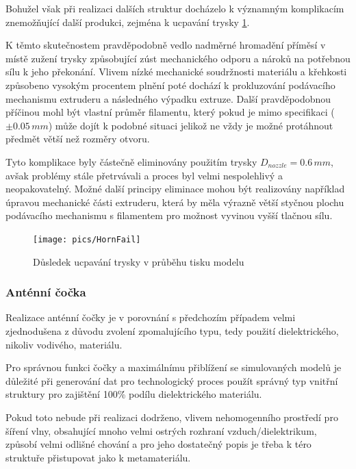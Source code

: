 Bohužel však při realizaci dalších struktur docházelo k významným komplikacím znemožňující další produkci, zejména k ucpavání trysky \ref{fig:HornFail}.

K těmto skutečnostem pravděpodobně vedlo nadměrné hromadění příměsí v místě zužení trysky způsobující zúst mechanického odporu a nároků na potřebnou sílu k jeho překonání. Vlivem nízké mechanické soudržnosti materiálu a křehkosti způsobeno vysokým procentem plnění poté dochází k prokluzování podávacího mechanismu extruderu a následného výpadku extruze. Další pravděpodobnou příčinou mohl být vlastní průměr filamentu, který pokud je mimo specifikaci ($\pm0.05\,mm$) může dojít k podobné situaci jelikož ne vždy je možné protáhnout předmět větší než rozměry otvoru. 

Tyto komplikace byly částečně eliminovány použitím trysky $D_{nozzle} = 0.6\,mm$, avšak problémy stále přetrvávali a proces byl velmi nespolehlivý a neopakovatelný. Možné další principy eliminace mohou být realizovány například úpravou mechanické části extruderu, která by měla výrazně větší styčnou plochu podávacího mechanismu s filamentem pro možnost vyvinou vyšší tlačnou sílu.

\begin{figure}[h]
\begin{center}
\texttt{[image: pics/HornFail]}
\caption{Důsledek ucpavání trysky v průběhu tisku modelu}
\label{fig:HornFail}
\end{center}
\end{figure}


\subsubsection{Anténní čočka}
Realizace anténní čočky je v porovnání s předchozím případem velmi zjednodušena z důvodu zvolení zpomalujícího typu, tedy použití dielektrického, nikoliv vodivého, materiálu.

Pro správnou funkci čočky a maximálnímu přiblížení se simulovaných modelů je důležité při generování dat pro technologický proces použít správný typ vnitřní struktury pro zajištění 100\.\% podílu dielektrického materiálu.

Pokud toto nebude při realizaci dodrženo, vlivem nehomogenního prostředí pro šíření vlny, obsahující mnoho velmi ostrých rozhraní vzduch/dielektrikum, způsobí velmi odlišné chování a pro jeho dostatečný popis je třeba k téro struktuře přistupovat jako k metamateriálu.



